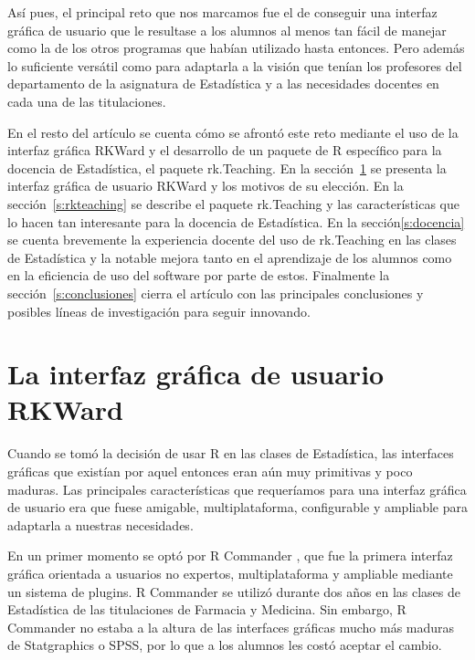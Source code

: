 \documentclass[a4paper,10pt,twoside]{article}
\newcommand{\rkteaching}{\textsf{rk.Teaching}}
\newcommand{\rkward}{\textsf{RKWard}}
\newcommand{\spss}{\textsf{SPSS}}
\newcommand{\statgraphics}{\textsf{Statgraphics}}
\begin{document}
Así pues, el principal reto que nos marcamos fue el de conseguir una interfaz gráfica de usuario que le resultase a los
alumnos al menos tan fácil de manejar como la de los otros programas que habían utilizado hasta entonces.
Pero además lo suficiente versátil como para adaptarla a la visión que tenían los profesores del departamento de la
asignatura de Estadística y a las necesidades docentes en cada una de las titulaciones.

En el resto del artículo se cuenta cómo se afrontó este reto mediante el uso de la interfaz gráfica \rkward{} y el
desarrollo de un paquete de R específico para la docencia de Estadística, el paquete \rkteaching. 
En la sección~\ref{s:rkward} se presenta la interfaz gráfica de usuario \rkward{} y los motivos de su elección. 
En la sección~\ref{s:rkteaching} se describe el paquete \rkteaching{} y las características que lo hacen tan interesante
para la docencia de Estadística. 
En la sección\ref{s:docencia} se cuenta brevemente la experiencia docente del uso de rk.Teaching en las clases de
Estadística y la notable mejora tanto en el aprendizaje de los alumnos como en la eficiencia de uso del software por
parte de estos. 
Finalmente la sección~\ref{s:conclusiones} cierra el artículo con las principales conclusiones y posibles líneas de
investigación para seguir innovando.


\section{La interfaz gráfica de usuario \rkward}
\label{s:rkward}
Cuando se tomó la decisión de usar R en las clases de Estadística, las interfaces gráficas que existían por aquel
entonces eran aún muy primitivas y poco maduras.
Las principales características que requeríamos para una interfaz gráfica de usuario era que fuese amigable,
multiplataforma, configurable y ampliable para adaptarla a nuestras necesidades.

En un primer momento se optó por \textsf{R Commander} \cite{fox2005r}, que fue la primera interfaz gráfica orientada a
usuarios no expertos, multiplataforma y ampliable mediante un sistema de plugins.
\textsf{R Commander} se utilizó durante dos años en las clases de Estadística de las titulaciones de Farmacia y
Medicina.
Sin embargo, \textsf{R Commander} no estaba a la altura de las interfaces gráficas mucho más maduras de \statgraphics{} o
\spss{}, por lo que a los alumnos les costó aceptar el cambio. 
\end{document}
